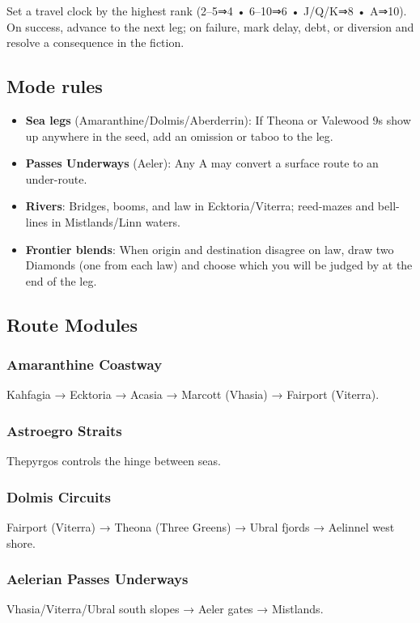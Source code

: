 \documentclass[11pt]{article}
\begin{document}
Set a travel clock by the highest rank (2–5⇒4 • 6–10⇒6 • J/Q/K⇒8 • A⇒10). On success, advance to the next leg; on failure, mark delay, debt, or diversion and resolve a consequence in the fiction.

\subsection{Mode rules}
\begin{itemize}
    \item \textbf{Sea legs} (Amaranthine/Dolmis/Aberderrin): If Theona or Valewood 9s show up anywhere in the seed, add an omission or taboo to the leg.
    \item \textbf{Passes Underways} (Aeler): Any A may convert a surface route to an under-route.
    \item \textbf{Rivers}: Bridges, booms, and law in Ecktoria/Viterra; reed-mazes and bell-lines in Mistlands/Linn waters.
    \item \textbf{Frontier blends}: When origin and destination disagree on law, draw two Diamonds (one from each law) and choose which you will be judged by at the end of the leg.
\end{itemize}

\subsection{Route Modules}
\subsubsection{Amaranthine Coastway}
Kahfagia → Ecktoria → Acasia → Marcott (Vhasia) → Fairport (Viterra).

\subsubsection{Astroegro Straits}
Thepyrgos controls the hinge between seas.

\subsubsection{Dolmis Circuits}
Fairport (Viterra) → Theona (Three Greens) → Ubral fjords → Aelinnel west shore.

\subsubsection{Aelerian Passes Underways}
Vhasia/Viterra/Ubral south slopes → Aeler gates → Mistlands.
\end{document}
